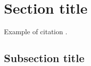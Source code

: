 \section{Section title}

Example of citation \cite{article1}.


\subsection{Subsection title}

\lipsum[3]

\lipsum[4] 